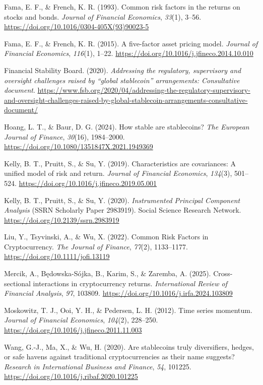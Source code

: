 \documentclass[
  12pt,
  a4paper,
  openany]{scrbook}
\newlength{\cslhangindent}
\newenvironment{CSLReferences}[2] %
 {\begin{list}{}{%
  \setlength{\itemindent}{0pt}
  \setlength{\leftmargin}{0pt}
  \setlength{\parsep}{0pt}
  \ifodd #1
   \setlength{\leftmargin}{\cslhangindent}
   \setlength{\itemindent}{-1\cslhangindent}
  \fi
  \setlength{\itemsep}{#2\baselineskip}}}
 {\end{list}}
\begin{document}
\begin{CSLReferences}{1}{0}
Fama, E. F., \& French, K. R. (1993). Common risk factors in the returns
on stocks and bonds. \emph{Journal of Financial Economics},
\emph{33}(1), 3--56. \url{https://doi.org/10.1016/0304-405X(93)90023-5}

Fama, E. F., \& French, K. R. (2015). A five-factor asset pricing model.
\emph{Journal of Financial Economics}, \emph{116}(1), 1--22.
\url{https://doi.org/10.1016/j.jfineco.2014.10.010}

Financial Stability Board. (2020). \emph{Addressing the regulatory,
supervisory and oversight challenges raised by {``global stablecoin''}
arrangements: Consultative document}.
\url{https://www.fsb.org/2020/04/addressing-the-regulatory-supervisory-and-oversight-challenges-raised-by-global-stablecoin-arrangements-consultative-document/}

Hoang, L. T., \& Baur, D. G. (2024). How stable are stablecoins?
\emph{The European Journal of Finance}, \emph{30}(16), 1984--2000.
\url{https://doi.org/10.1080/1351847X.2021.1949369}

Kelly, B. T., Pruitt, S., \& Su, Y. (2019). Characteristics are
covariances: A unified model of risk and return. \emph{Journal of
Financial Economics}, \emph{134}(3), 501--524.
\url{https://doi.org/10.1016/j.jfineco.2019.05.001}

Kelly, B. T., Pruitt, S., \& Su, Y. (2020). \emph{Instrumented Principal
Component Analysis} (SSRN Scholarly Paper 2983919). Social Science
Research Network. \url{https://doi.org/10.2139/ssrn.2983919}

Liu, Y., Tsyvinski, A., \& Wu, X. (2022). Common Risk Factors in
Cryptocurrency. \emph{The Journal of Finance}, \emph{77}(2), 1133--1177.
\url{https://doi.org/10.1111/jofi.13119}

Mercik, A., Będowska-Sójka, B., Karim, S., \& Zaremba, A. (2025).
Cross-sectional interactions in cryptocurrency returns.
\emph{International Review of Financial Analysis}, \emph{97}, 103809.
\url{https://doi.org/10.1016/j.irfa.2024.103809}

Moskowitz, T. J., Ooi, Y. H., \& Pedersen, L. H. (2012). Time series
momentum. \emph{Journal of Financial Economics}, \emph{104}(2),
228--250. \url{https://doi.org/10.1016/j.jfineco.2011.11.003}

Wang, G.-J., Ma, X., \& Wu, H. (2020). Are stablecoins truly
diversifiers, hedges, or safe havens against traditional
cryptocurrencies as their name suggests? \emph{Research in International
Business and Finance}, \emph{54}, 101225.
\url{https://doi.org/10.1016/j.ribaf.2020.101225}

\end{CSLReferences}
\end{document}
